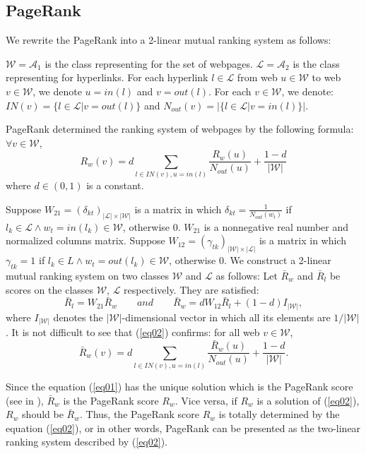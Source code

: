 \documentclass[10pt,leqno,twoside]{article}
\begin{document}
\subsection{PageRank}\label{Sect:PageRank}
We rewrite the PageRank into a 2-linear mutual ranking system as follows:

$\mathcal{W}= \mathcal{A}_1$ is the class representing for the set of webpages. $\mathcal{L}= \mathcal{A}_2$ is the class representing for hyperlinks. For each hyperlink $l\in \mathcal{L}$ from web $u\in \mathcal{W}$ to web $v \in \mathcal{W}$, we denote $u=in(l)$ and $v=out(l)$. For each $v \in \mathcal{W}$, we denote: $IN(v)=\{l \in \mathcal{L}|  v=out(l)\}$ and $N_{out}(v)=|\{ l\in \mathcal{L}| v=in(l)\}|$.
\setlength{\parskip}{3pt}

PageRank\cite{pagerank98} determined the ranking system of webpages by the following formula: $\forall v\in\mathcal{W}$,
\begin{equation}\label{eq01}
R_w(v) = d\sum_{l \in IN(v), u=in(l)} \frac{R_w(u)}{N_{out}(u)} + \frac{1-d}{|\mathcal{W}|}
\end{equation}
where $d\in (0,1)$ is a constant.
\setlength{\parskip}{3pt}

Suppose  $W_{21} = (\delta_{kt}) _{|\mathcal{L}|\times |\mathcal{W}|}$ is a matrix in which $\delta_{kt} = \frac{1}{N_{out}(w_t)}$ if $l_k\in \mathcal{L} \wedge w_t= in (l_k)\in \mathcal{W}$, otherwise 0. $W_{21}$ is a nonnegative real number and normalized columns matrix. Suppose  $W_{12} = (\gamma_{tk}) _{|\mathcal{W}|\times |\mathcal{L}|}$ is a matrix in which $\gamma_{tk} = 1$ if $l_k\in L \wedge w_t= out (l_k)\in \mathcal{W}$, otherwise 0. We construct a 2-linear mutual ranking system on two classes $\mathcal{W}$ and $\mathcal{L}$ as follows: Let $\bar{R}_w$ and $\bar{R}_l$ be scores on the classes $\mathcal{W}$, $\mathcal{L}$ respectively. They are satisfied:
\begin{equation}\label{eq02}
\bar{R}_l = W_{21}\bar{R}_w\qquad and \qquad
\bar{R}_w = dW_{12}\bar{R}_l + (1-d)I_{|\mathcal{W}|},
\end{equation}
where $I_{|\mathcal{W}|}$ denotes the $|\mathcal{W}|$-dimensional vector in which all its elements are $1/|\mathcal{W}|$. It is not difficult to see that (\ref{eq02}) confirms: for all web $v\in\mathcal{W}$,
\[\bar{R}_w(v) = d\sum_{l \in IN(v), u=in(l)} \frac{\bar{R}_w(u)}{N_{out}(u)} + \frac{1-d}{|\mathcal{W}|}.\]

Since the equation (\ref{eq01}) has the unique solution which is the PageRank score (see in \cite{pagerank98}), $\bar{R}_w$ is the PageRank score $R_w$. Vice versa, if $R_w$ is a solution of (\ref{eq02}), $R_w$ should be $\bar{R}_w$. Thus, the PageRank score $R_w$ is totally determined by the equation (\ref{eq02}), or in other words, PageRank can be presented as the two-linear ranking system described by (\ref{eq02}).
\setlength{\parskip}{3pt}
\end{document}
